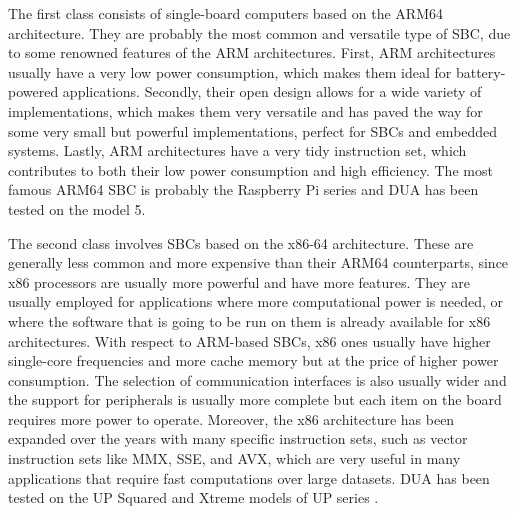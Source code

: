 The first class consists of single-board computers based on the ARM64 architecture. They are probably the most common and versatile type of SBC, due to some renowned features of the ARM architectures. First, ARM architectures usually have a very low power consumption, which makes them ideal for battery-powered applications. Secondly, their open design allows for a wide variety of implementations, which makes them very versatile and has paved the way for some very small but powerful implementations, perfect for SBCs and embedded systems. Lastly, ARM architectures have a very tidy instruction set, which contributes to both their low power consumption and high efficiency. The most famous ARM64 SBC is probably the Raspberry Pi series \cite{raspberry_pi_ltd_raspberry_nodate} and DUA has been tested on the model 5.

The second class involves SBCs based on the x86-64 architecture. These are generally less common and more expensive than their ARM64 counterparts, since x86 processors are usually more powerful and have more features. They are usually employed for applications where more computational power is needed, or where the software that is going to be run on them is already available for x86 architectures. With respect to ARM-based SBCs, x86 ones usually have higher single-core frequencies and more cache memory but at the price of higher power consumption. The selection of communication interfaces is also usually wider and the support for peripherals is usually more complete but each item on the board requires more power to operate. Moreover, the x86 architecture has been expanded over the years with many specific instruction sets, such as vector instruction sets like MMX, SSE, and AVX, which are very useful in many applications that require fast computations over large datasets. DUA has been tested on the UP Squared and Xtreme models of UP series \cite{aaeon_technology_up_nodate}.

